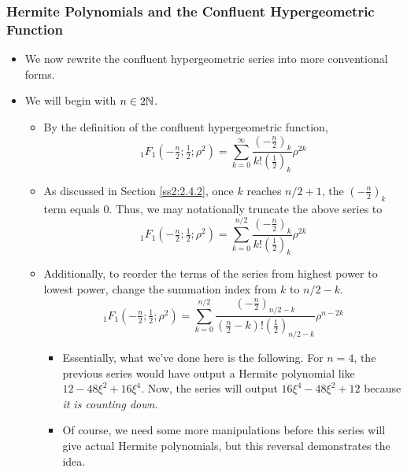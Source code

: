 \documentclass[../finalProject.tex]{subfiles}
\begin{document}
\subsubsection{Hermite Polynomials and the Confluent Hypergeometric Function}\label{ss2:3.2.2}
\begin{itemize}
    \item We now rewrite the confluent hypergeometric series into more conventional forms.
    \item We will begin with $n\in 2\mathbb{N}$.
    \begin{itemize}
        \item By the definition of the confluent hypergeometric function,
        \begin{equation*}
            {}_1F_1(-\tfrac{n}{2};\tfrac{1}{2};\rho^2) = \sum_{k=0}^\infty\frac{\left( -\frac{n}{2} \right)_k}{k!\left( \frac{1}{2} \right)_k}\rho^{2k}
        \end{equation*}
        \item As discussed in Section \ref{ss2:2.4.2}, once $k$ reaches $n/2+1$, the $\left( -\frac{n}{2} \right)_k$ term equals 0. Thus, we may notationally truncate the above series to
        \begin{equation*}
            {}_1F_1(-\tfrac{n}{2};\tfrac{1}{2};\rho^2) = \sum_{k=0}^{n/2}\frac{\left( -\frac{n}{2} \right)_k}{k!\left( \frac{1}{2} \right)_k}\rho^{2k}
        \end{equation*}
        \item Additionally, to reorder the terms of the series from highest power to lowest power, change the summation index from $k$ to $n/2-k$.
        \begin{equation*}
            {}_1F_1(-\tfrac{n}{2};\tfrac{1}{2};\rho^2) = \sum_{k=0}^{n/2}\frac{\left( -\frac{n}{2} \right)_{n/2-k}}{\left( \frac{n}{2}-k \right)!\left( \frac{1}{2} \right)_{n/2-k}}\rho^{n-2k}
        \end{equation*}
        \begin{itemize}
            \item Essentially, what we've done here is the following. For $n=4$, the previous series would have output a Hermite polynomial like $12-48\xi^2+16\xi^4$. Now, the series will output $16\xi^4-48\xi^2+12$ because \emph{it is counting down}.
            \item Of course, we need some more manipulations before this series will give actual Hermite polynomials, but this reversal demonstrates the idea.
        \end{itemize}

\end{itemize}
\end{itemize}
\end{document}
